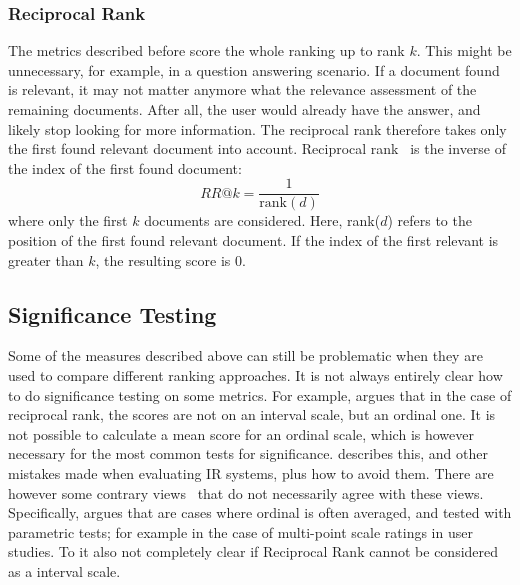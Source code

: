 \subsubsection{Reciprocal Rank} 
The metrics described before score the whole ranking up to rank $k$. This might be unnecessary, for example, in a question answering scenario. If a document found is relevant, it may not matter anymore what the relevance assessment of the remaining documents. After all, the user would already have the answer, and likely stop looking for more information. The reciprocal rank therefore takes only the first found relevant document into account. Reciprocal rank~\citep{mrr} is the inverse of the index of the first found document:
\begin{equation}
	\textit{RR@k} = \frac{1}{\text{rank}(d)}
\end{equation}
where only the first $k$ documents are considered. Here, rank($d$) refers to the position of the first found relevant document. If the index of the first relevant is greater than $k$, the resulting score is $0$.

\subsection{Significance Testing}
Some of the measures described above can still be problematic when they are used to compare different ranking approaches. It is not always entirely clear how to do significance testing on some metrics. For example, \citet{fuhr-mrr} argues that in the case of reciprocal rank, the scores are not on an interval scale, but an ordinal one. It is not possible to calculate a mean score for an ordinal scale, which is however necessary for the most common tests for significance.  describes this, and other mistakes made when evaluating IR systems, plus how to avoid them. There are however some contrary views~\citep{on-fuhrs-guideline} that do not necessarily agree with these views. Specifically, \citeauthor{on-fuhrs-guideline} argues that are cases where ordinal is often averaged, and tested with parametric tests; for example in the case of multi-point scale ratings in user studies. To \citeauthor{on-fuhrs-guideline} it also not completely clear if Reciprocal Rank cannot be considered as a interval scale.

